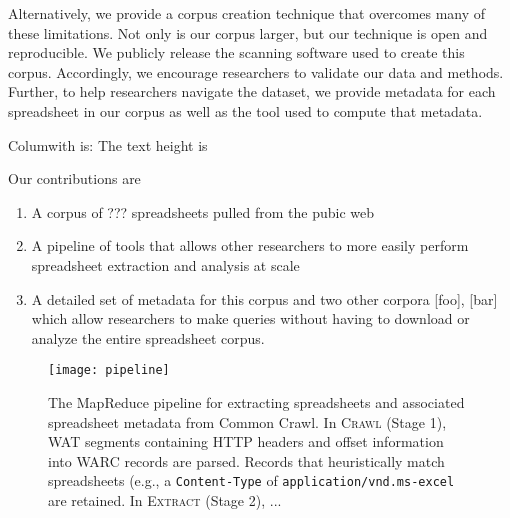 \documentclass[conference]{IEEEtran}
\begin{document}
Alternatively, we provide a corpus creation technique that overcomes many of these limitations. 
Not only is our corpus larger, but our technique is open and reproducible.  
We publicly release the scanning software used to create this corpus.
Accordingly, we encourage researchers to validate our data and methods.
Further, to help researchers navigate the dataset, we provide metadata for each spreadsheet in our corpus as well as the tool used to compute that metadata.

Columwith is: The text height is \the\columnwidth


Our contributions are 
\begin{enumerate}
\item A corpus of ??? spreadsheets pulled from the pubic web
\item A pipeline of tools that allows other researchers to more easily perform spreadsheet extraction and analysis at scale
\item A detailed set of metadata for this corpus and two other corpora [foo], [bar]  which allow researchers to make queries without having to download or analyze the entire spreadsheet corpus.  
\end{enumerate}


\begin{figure*}[!t]
\centering
\texttt{[image: pipeline]}
\caption{The MapReduce pipeline for extracting spreadsheets and associated spreadsheet metadata from Common Crawl. In \textsc{Crawl} (Stage 1), WAT segments containing HTTP headers and offset information into WARC records are parsed. Records that heuristically match spreadsheets (e.g., a \texttt{Content-Type} of \texttt{application/vnd.ms-excel} are retained. In \textsc{Extract} (Stage 2), ...}
\label{fig:mrpipeline}
\end{figure*}

\end{document}
